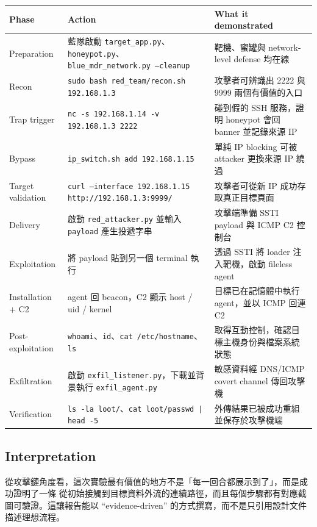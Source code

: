 \documentclass[UTF8,11pt]{ctexart}
\begin{document}
\begin{longtable}{>{\raggedright\arraybackslash}p{1.6cm} >{\raggedright\arraybackslash}p{5.0cm} >{\raggedright\arraybackslash}p{7.3cm}}
\toprule
Phase & Action & What it demonstrated \\
\midrule
Preparation & 藍隊啟動 \texttt{target\_app.py}、\texttt{honeypot.py}、\texttt{blue\_mdr\_network.py --cleanup} & 靶機、蜜罐與 network-level defense 均在線 \\
Recon & \texttt{sudo bash red\_team/recon.sh 192.168.1.3} & 攻擊者可辨識出 2222 與 9999 兩個有價值的入口 \\
Trap trigger & \texttt{nc -s 192.168.1.14 -v 192.168.1.3 2222} & 碰到假的 SSH 服務，證明 honeypot 會回 banner 並記錄來源 IP \\
Bypass & \texttt{ip\_switch.sh add 192.168.1.15} & 單純 IP blocking 可被 attacker 更換來源 IP 繞過 \\
Target validation & \texttt{curl --interface 192.168.1.15 http://192.168.1.3:9999/} & 攻擊者可從新 IP 成功存取真正目標頁面 \\
Delivery & 啟動 \texttt{red\_attacker.py} 並輸入 \texttt{payload} 產生投遞字串 & 攻擊端準備 SSTI payload 與 ICMP C2 控制台 \\
Exploitation & 將 payload 貼到另一個 terminal 執行 & 透過 SSTI 將 loader 注入靶機，啟動 fileless agent \\
Installation + C2 & agent 回 beacon，C2 顯示 host / uid / kernel & 目標已在記憶體中執行 agent，並以 ICMP 回連 C2 \\
Post-exploitation & \texttt{whoami}、\texttt{id}、\texttt{cat /etc/hostname}、\texttt{ls} & 取得互動控制，確認目標主機身份與檔案系統狀態 \\
Exfiltration & 啟動 \texttt{exfil\_listener.py}，下載並背景執行 \texttt{exfil\_agent.py} & 敏感資料經 DNS/ICMP covert channel 傳回攻擊機 \\
Verification & \texttt{ls -la loot/}、\texttt{cat loot/passwd | head -5} & 外傳結果已被成功重組並保存於攻擊機端 \\
\bottomrule
\end{longtable}

\subsection{Interpretation}
從攻擊鏈角度看，這次實驗最有價值的地方不是「每一回合都展示到了」，而是成功證明了一條
從初始接觸到目標資料外流的連續路徑，而且每個步驟都有對應截圖可驗證。這讓報告能以
``evidence-driven'' 的方式撰寫，而不是只引用設計文件描述理想流程。
\end{document}
